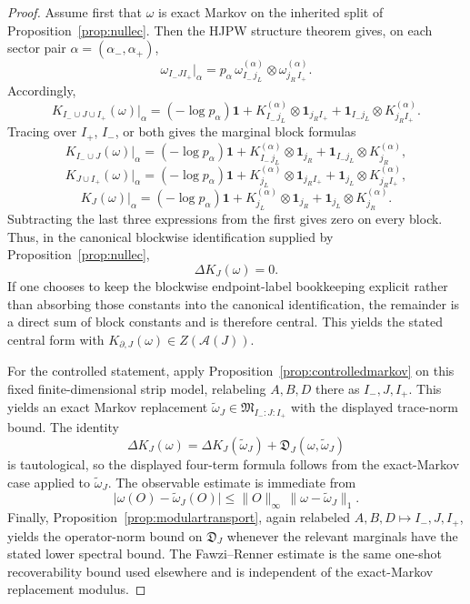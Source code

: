 \documentclass[11pt]{article}
\begin{document}
\begin{proof}
Assume first that \(\omega\) is exact Markov on the inherited split of Proposition~\ref{prop:nullec}. Then the HJPW structure theorem gives, on each sector pair \(\alpha=(\alpha_-,\alpha_+)\),
\[
\omega_{I_-JI_+}|_\alpha
=
p_\alpha\,
\omega_{I_-\,j_L}^{(\alpha)}
\otimes
\omega_{j_R\,I_+}^{(\alpha)}.
\]
Accordingly,
\[
K_{I_-\cup J\cup I_+}(\omega)\big|_\alpha
=
(-\log p_\alpha)\mathbf 1
+
K_{I_-\,j_L}^{(\alpha)}\otimes \mathbf 1_{j_R I_+}
+
\mathbf 1_{I_- j_L}\otimes K_{j_R I_+}^{(\alpha)}.
\]
Tracing over \(I_+\), \(I_-\), or both gives the marginal block formulas
\[
K_{I_-\cup J}(\omega)\big|_\alpha
=
(-\log p_\alpha)\mathbf 1
+
K_{I_-\,j_L}^{(\alpha)}\otimes \mathbf 1_{j_R}
+
\mathbf 1_{I_- j_L}\otimes K_{j_R}^{(\alpha)},
\]
\[
K_{J\cup I_+}(\omega)\big|_\alpha
=
(-\log p_\alpha)\mathbf 1
+
K_{j_L}^{(\alpha)}\otimes \mathbf 1_{j_R I_+}
+
\mathbf 1_{j_L}\otimes K_{j_R I_+}^{(\alpha)},
\]
\[
K_J(\omega)\big|_\alpha
=
(-\log p_\alpha)\mathbf 1
+
K_{j_L}^{(\alpha)}\otimes \mathbf 1_{j_R}
+
\mathbf 1_{j_L}\otimes K_{j_R}^{(\alpha)}.
\]
Subtracting the last three expressions from the first gives zero on every block. Thus, in the canonical blockwise identification supplied by Proposition~\ref{prop:nullec},
\[
\Delta K_J(\omega)=0.
\]
If one chooses to keep the blockwise endpoint-label bookkeeping explicit rather than absorbing those constants into the canonical identification, the remainder is a direct sum of block constants and is therefore central. This yields the stated central form with \(K_{\partial,J}(\omega)\in Z(\mathcal A(J))\).

For the controlled statement, apply Proposition~\ref{prop:controlledmarkov} on this fixed finite-dimensional strip model, relabeling \(A,B,D\) there as \(I_-,J,I_+\). This yields an exact Markov replacement \(\widetilde\omega_J\in \mathfrak M_{I_-:J:I_+}\) with the displayed trace-norm bound. The identity
\[
\Delta K_J(\omega)=\Delta K_J(\widetilde\omega_J)+\mathfrak D_J(\omega,\widetilde\omega_J)
\]
is tautological, so the displayed four-term formula follows from the exact-Markov case applied to \(\widetilde\omega_J\). The observable estimate is immediate from
\[
\bigl|\omega(O)-\widetilde\omega_J(O)\bigr|
\le
\|O\|_\infty\,
\|\omega-\widetilde\omega_J\|_1.
\]
Finally, Proposition~\ref{prop:modulartransport}, again relabeled \(A,B,D\mapsto I_-,J,I_+\), yields the operator-norm bound on \(\mathfrak D_J\) whenever the relevant marginals have the stated lower spectral bound. The Fawzi--Renner estimate is the same one-shot recoverability bound used elsewhere and is independent of the exact-Markov replacement modulus.
\end{proof}
\end{document}
